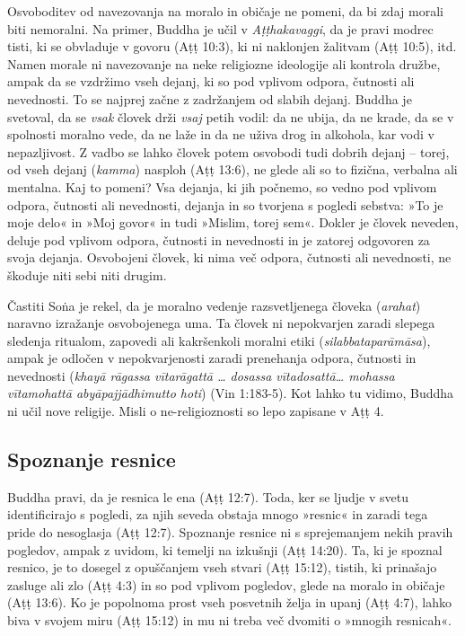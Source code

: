 Osvoboditev od navezovanja na moralo in običaje ne pomeni, da bi zdaj
morali biti nemoralni. Na primer, Buddha je učil v \emph{Aṭṭhakavaggi},
da je pravi modrec tisti, ki se obvladuje v govoru (Aṭṭ 10:3), ki ni
naklonjen žalitvam (Aṭṭ 10:5), itd. Namen morale ni navezovanje na neke
religiozne ideologije ali kontrola družbe, ampak da se vzdržimo vseh
dejanj, ki so pod vplivom odpora, čutnosti ali nevednosti. To se najprej
začne z zadržanjem od slabih dejanj. Buddha je svetoval, da se
\emph{vsak} človek drži \emph{vsaj} petih vodil: da ne ubija, da ne
krade, da se v spolnosti moralno vede, da ne laže in da ne uživa drog in
alkohola, kar vodi v nepazljivost. Z vadbo se lahko človek potem
osvobodi tudi dobrih dejanj -- torej, od vseh dejanj (\emph{kamma})
nasploh (Aṭṭ 13:6), ne glede ali so to fizična, verbalna ali mentalna.
Kaj to pomeni? Vsa dejanja, ki jih počnemo, so vedno pod vplivom odpora,
čutnosti ali nevednosti, dejanja in so tvorjena s pogledi sebstva: »To
je moje delo« in »Moj govor« in tudi »Mislim, torej sem«. Dokler je
človek neveden, deluje pod vplivom odpora, čutnosti in nevednosti in je
zatorej odgovoren za svoja dejanja. Osvobojeni človek, ki nima več
odpora, čutnosti ali nevednosti, ne škoduje niti sebi niti drugim.

\label{silabbata}
Častiti Soṅa je rekel, da je moralno vedenje razsvetljenega človeka
(\emph{arahat}) naravno izražanje osvobojenega uma. Ta človek ni
nepokvarjen zaradi slepega sledenja ritualom, zapovedi ali kakršenkoli
moralni etiki (\emph{silabbataparāmāsa}), ampak je odločen v
nepokvarjenosti zaradi prenehanja odpora, čutnosti in nevednosti
(\emph{khayā rāgassa vītarāgattā \ldots{} dosassa vītadosattā\ldots{}
mohassa vītamohattā abyāpajjādhimutto hoti}) (Vin 1:183-5). Kot lahko tu
vidimo, Buddha ni učil nove religije. Misli o ne-religioznosti so lepo
zapisane v Aṭṭ 4.

\subsection{Spoznanje resnice}

Buddha pravi, da je resnica le ena
(Aṭṭ 12:7). Toda, ker se ljudje v svetu identificirajo s pogledi, za
njih seveda obstaja mnogo »resnic« in zaradi tega pride do nesoglasja
(Aṭṭ 12:7). Spoznanje resnice ni s sprejemanjem nekih pravih pogledov,
ampak z uvidom, ki temelji na izkušnji (Aṭṭ 14:20). Ta, ki je spoznal
resnico, je to dosegel z opuščanjem vseh stvari (Aṭṭ 15:12), tistih, ki
prinašajo zasluge ali zlo (Aṭṭ 4:3) in so pod vplivom pogledov, glede na
moralo in običaje (Aṭṭ 13:6). Ko je popolnoma prost vseh posvetnih želja
in upanj (Aṭṭ 4:7), lahko biva v svojem miru (Aṭṭ 15:12) in mu ni treba
več dvomiti o »mnogih resnicah«.

